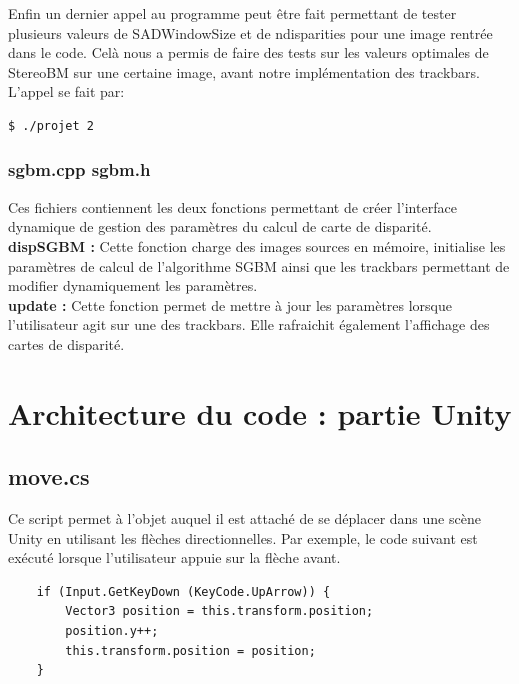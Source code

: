 \documentclass[a4paper]{article}
\begin{document}
Enfin un dernier appel au programme peut être fait permettant de tester plusieurs valeurs de SADWindowSize et de ndisparities pour une image rentrée dans le code. Celà nous a permis de faire des tests sur les valeurs optimales de StereoBM sur une certaine image, avant notre implémentation des trackbars. L'appel se fait par:
\begin{verbatim}
$ ./projet 2
\end{verbatim}

\subsubsection*{sgbm.cpp sgbm.h}

Ces fichiers contiennent les deux fonctions permettant de créer l'interface dynamique
de gestion des paramètres du calcul de carte de disparité. \\
\textbf{dispSGBM :} Cette fonction charge des images sources en mémoire, initialise
les paramètres de calcul de l'algorithme SGBM ainsi que les trackbars permettant de
modifier dynamiquement les paramètres. \\
\textbf{update :} Cette fonction permet de mettre à jour les paramètres lorsque
l'utilisateur agit sur une des trackbars. Elle rafraichit également l'affichage des
cartes de disparité.


\section{Architecture du code : partie Unity}

\subsection*{move.cs}

Ce script permet à l'objet auquel il est attaché de se déplacer dans une scène
Unity en utilisant les flèches directionnelles. Par exemple, le code suivant est
exécuté lorsque l'utilisateur appuie sur la flèche avant.
\begin{verbatim}
	if (Input.GetKeyDown (KeyCode.UpArrow)) {
		Vector3 position = this.transform.position;
		position.y++;
		this.transform.position = position;
	}
\end{verbatim}
\end{document}
